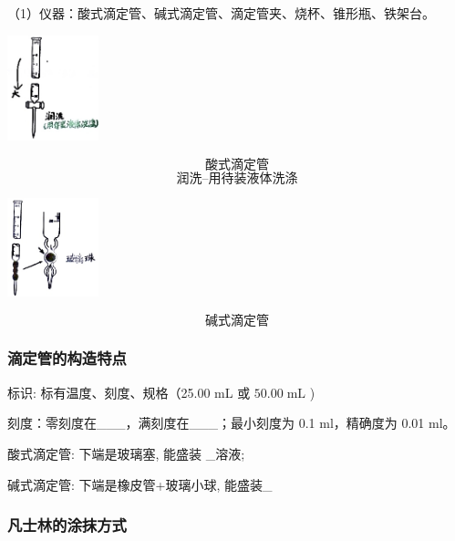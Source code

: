 \documentclass[10pt,cn]{elegantbook}
\begin{document}
	（1）仪器：酸式滴定管、碱式滴定管、滴定管夹、烧杯、锥形瓶、铁架台。
	
	\begin{center}
		\includegraphics[max width=0.2\textwidth]{image/c2-2.jpg}
	\end{center}
	\[\mbox{酸式滴定管}\]
		\[\mbox{润洗--用待装液体洗涤}\]
	\begin{center}
		\includegraphics[max width=0.2\textwidth]{image/c2-3.jpg}
	\end{center}
		\[\mbox{碱式滴定管}\]
	 
	
	\subsubsection{滴定管的构造特点}
	
		标识: 标有温度、刻度、规格（25.00 mL 或 \({50.00}\mathrm{\;{mL}}\) )%
	
	刻度：零刻度在\_\_\_，满刻度在\_\_\_；最小刻度为 0.1 ml，精确度为 0.01 ml。%
	
	酸式滴定管: 下端是玻璃塞, 能盛装 \_溶液;
	
	碱式滴定管: 下端是橡皮管+玻璃小球, 能盛装\_
	
	
	
	
	\subsubsection{凡士林的涂抹方式}
	
\end{document}
